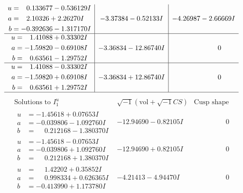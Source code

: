 \documentclass[1p]{elsarticle_modified}
\theoremstyle{definition}
\newcommand{\I}{\sqrt{-1}}
\begin{document}
$$\begin{array}{c|c|c}
\begin{aligned}
u &= \phantom{-}0.133677 - 0.536129 I \\
a &= \phantom{-}2.10326 + 2.26270 I \\
b &= -0.392636 - 1.317170 I\end{aligned}
 & -3.37384 - 0.52133 I & -4.26987 - 2.66669 I \\ \hline\begin{aligned}
u &= \phantom{-}1.41088 + 0.33302 I \\
a &= -1.59820 - 0.69108 I \\
b &= \phantom{-}0.63561 - 1.29752 I\end{aligned}
 & -3.36834 - 12.86740 I & \phantom{-0.000000 } 0 \\ \hline\begin{aligned}
u &= \phantom{-}1.41088 - 0.33302 I \\
a &= -1.59820 + 0.69108 I \\
b &= \phantom{-}0.63561 + 1.29752 I\end{aligned}
 & -3.36834 + 12.86740 I & \phantom{-0.000000 } 0\\
 \hline 
 \end{array}$$\newpage$$\begin{array}{c|c|c}  
\text{Solutions to }I^u_{1}& \I (\text{vol} + \sqrt{-1}CS) & \text{Cusp shape}\\
 \hline 
\begin{aligned}
u &= -1.45618 + 0.07653 I \\
a &= -0.039806 - 1.092760 I \\
b &= \phantom{-}0.212168 - 1.380370 I\end{aligned}
 & -12.94690 - 0.82105 I & \phantom{-0.000000 } 0 \\ \hline\begin{aligned}
u &= -1.45618 - 0.07653 I \\
a &= -0.039806 + 1.092760 I \\
b &= \phantom{-}0.212168 + 1.380370 I\end{aligned}
 & -12.94690 + 0.82105 I & \phantom{-0.000000 } 0 \\ \hline\begin{aligned}
u &= \phantom{-}1.42202 + 0.35852 I \\
a &= \phantom{-}0.998334 + 0.626365 I \\
b &= -0.413990 + 1.173780 I\end{aligned}
 & -4.21413 - 4.94470 I & \phantom{-0.000000 } 0 \\ \hline\begin{aligned}

\end{aligned}
\end{array}$$
\end{document}

